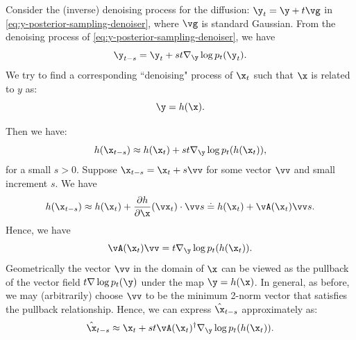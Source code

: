 \documentclass[../../book-main.tex]{subfiles}
\begin{document}
Consider the (inverse) denoising process for the diffusion: $\y_t = \y + t\vg $ in \eqref{eq:y-posterior-sampling-denoiser}, where $\vg$ is standard Gaussian. From the denoising process of \eqref{eq:y-posterior-sampling-denoiser}, we have
\begin{equation}
    \y_{t-s} =  \y_t + st \nabla_{\y} \log p_t(\y_t).
\end{equation}
We try to find a corresponding ``denoising" process of $\x_t$ such that $\x$ is related to $y$ as:
\begin{equation}
    \y =  h(\x).
\end{equation}

Then we have:
\begin{equation}
    h(\x_{t-s}) \approx  h(\x_t) + st \nabla_{\y} \log p_t(h(\x_t)),
\end{equation}
for a small $s >0$. 
Suppose $\x_{t-s} = \x_t + s \vv$ for some vector $\vv$ and small increment $s$. We have
\begin{equation}
    h(\x_{t-s}) \approx h(\x_t) + \frac{\partial h}{\partial \x}(\vx_{t}) \cdot \vv s \doteq h(\x_t) + \vA(\x_t) \vv s. 
\end{equation}
Hence, we have
\begin{equation}
    \vA(\x_t) \vv = t \nabla_{\y} \log p_t(h(\x_t)).
    \label{eqn:pushforward}
\end{equation}
Geometrically the vector $\vv$ in the domain of $\x$ can be viewed as the pullback of the vector field $t \nabla \log p_t(\y)$ under the map $\y = h(\x)$. In general, as before, we may (arbitrarily) choose $\vv$ to be the minimum 2-norm vector that satisfies the pullback relationship. Hence, we can express  $\hat{\x}_{t-s}$ approximately as:
\begin{equation}
    \hat{\x}_{t-s} \approx \x_t + st\vA(\x_t)^\dagger \nabla_{\y} \log p_t(h(\x_t)). 
\label{eqn:pullback-denoise}
\end{equation}
\end{document}
